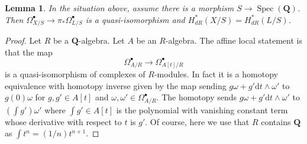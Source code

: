 \documentclass[10pt,a4paper]{amsart}
\theoremstyle{plain}
\newtheorem{lemma}[subsection]{Lemma}
\theoremstyle{definition}
\theoremstyle{remark}
\numberwithin{equation}{subsection}
\def\Spec{\mathop{\mathrm{Spec}}}
\begin{document}
\begin{lemma}
\label{lemma-line-bundle-characteristic-zero}
In the situation above, assume there is a morphism $S \to \Spec(\mathbf{Q})$.
Then $\Omega^\bullet_{X/S} \to \pi_*\Omega^\bullet_{L/S}$ is a
quasi-isomorphism and $H_{dR}^*(X/S) = H_{dR}^*(L/S)$.
\end{lemma}

\begin{proof}
Let $R$ be a $\mathbf{Q}$-algebra. Let $A$ be an $R$-algebra.
The affine local statement is that the map
$$
\Omega^\bullet_{A/R} \longrightarrow \Omega^\bullet_{A[t]/R}
$$
is a quasi-isomorphism of complexes of $R$-modules. In fact it is a
homotopy equivalence with homotopy inverse given by the map sending
$g \omega + g' \text{d}t \wedge \omega'$ to $g(0)\omega$ for
$g, g' \in A[t]$ and $\omega, \omega' \in \Omega^\bullet_{A/R}$.
The homotopy sends $g \omega + g' \text{d}t \wedge \omega'$
to $(\int g') \omega'$ where $\int g' \in A[t]$ is the polynomial
with vanishing constant term whose derivative with respect to $t$
is $g'$. Of course, here we use that $R$ contains $\mathbf{Q}$
as $\int t^n = (1/n)t^{n + 1}$.
\end{proof}
\end{document}

